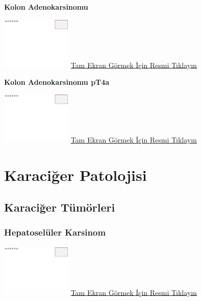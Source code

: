 \documentclass[
  letterpaper,
  DIV=11,
  numbers=noendperiod]{scrreprt}
\begin{document}
\textbf{Kolon Adenokarsinomu}

\href{https://images.patolojiatlasi.com/template/HE.html}{\includegraphics[width=0.25\textwidth,height=\textheight]{./screenshots/template_screenshot.png}}
\href{https://images.patolojiatlasi.com/colon-adenocarcinoma/HE2.html}{Tam
Ekran Görmek İçin Resmi Tıklayın}

\textbf{Kolon Adenokarsinomu pT4a}

\href{https://images.patolojiatlasi.com/template/HE.html}{\includegraphics[width=0.25\textwidth,height=\textheight]{./screenshots/template_screenshot.png}}
\href{https://images.patolojiatlasi.com/colon-adenocarcinoma/HE3.html}{Tam
Ekran Görmek İçin Resmi Tıklayın}

\part{Karaciğer Patolojisi}

\hypertarget{sec-karaciger-tumorleri}{%
\chapter{Karaciğer Tümörleri}\label{sec-karaciger-tumorleri}}

\hypertarget{sec-hepatoseluler-karsinom}{%
\section{Hepatoselüler Karsinom}\label{sec-hepatoseluler-karsinom}}

\href{https://images.patolojiatlasi.com/template/HE.html}{\includegraphics[width=0.25\textwidth,height=\textheight]{./screenshots/template_screenshot.png}}
\href{https://images.patolojiatlasi.com/hepatocellularcarcinoma/HCC/viewer_z0.html}{Tam
Ekran Görmek İçin Resmi Tıklayın}
\end{document}

